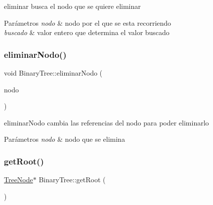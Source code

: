 eliminar busca el nodo que se quiere eliminar 


\begin{DoxyParams}{Parámetros}
{\em nodo} & nodo por el que se esta recorriendo \\
\hline
{\em buscado} & valor entero que determina el valor buscado \\
\hline
\end{DoxyParams}
\mbox{\label{class_binary_tree_ae67035ec37e83ccbceabb71826226e8d}} 
\subsubsection{\texorpdfstring{eliminar\+Nodo()}{eliminarNodo()}}
{\footnotesize\ttfamily void Binary\+Tree\+::eliminar\+Nodo (\begin{DoxyParamCaption}\item[{\mbox{\hyperlink{class_tree_node}{Tree\+Node}} $\ast$}]{nodo }\end{DoxyParamCaption})\hspace{0.3cm}{\ttfamily [inline]}}



eliminar\+Nodo cambia las referencias del nodo para poder eliminarlo 


\begin{DoxyParams}{Parámetros}
{\em nodo} & nodo que se elimina \\
\hline
\end{DoxyParams}
\mbox{\label{class_binary_tree_aabfed860b1c67b2a1cd12eacf870fc8c}} 
\subsubsection{\texorpdfstring{get\+Root()}{getRoot()}}
{\footnotesize\ttfamily \mbox{\hyperlink{class_tree_node}{Tree\+Node}}$\ast$ Binary\+Tree\+::get\+Root (\begin{DoxyParamCaption}{ }\end{DoxyParamCaption})\hspace{0.3cm}{\ttfamily [inline]}}

\mbox{\label{class_binary_tree_a198bb1b6bd9d4fe1535d8189b9d3dc3e}} 
